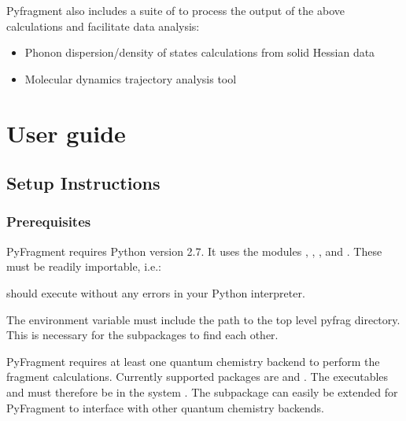 \documentclass[letterpaper,10pt,english]{sphinxmanual}
\begin{document}
Pyfragment also includes a suite of  to process the output of the above
calculations and facilitate data analysis:
\begin{itemize}
\item {} 
Phonon dispersion/density of states calculations from solid Hessian data

\item {} 
Molecular dynamics trajectory analysis tool

\end{itemize}


\chapter{User guide}
\label{\detokenize{index:user-guide}}\label{\detokenize{index:pyfragment-documentation}}

\section{Setup Instructions}
\label{\detokenize{setup:setup-instructions}}\label{\detokenize{setup::doc}}

\subsection{Prerequisites}
\label{\detokenize{setup:prerequisites}}
PyFragment requires Python version 2.7. It uses the modules , , , and . These must
be readily importable, i.e.:

\begin{sphinxVerbatim}[commandchars=\\\{\}]
 
 
 
 
 
\end{sphinxVerbatim}

should execute without any errors in your Python interpreter.

The  environment variable must include the path to the top level
pyfrag directory. This is necessary for the subpackages to find each other.

PyFragment requires at least one quantum chemistry backend to perform the
fragment calculations. Currently supported packages are  and . The
executables   and  must therefore be in the system
. The  subpackage can easily be extended for
PyFragment to interface with other quantum chemistry backends.
\end{document}
